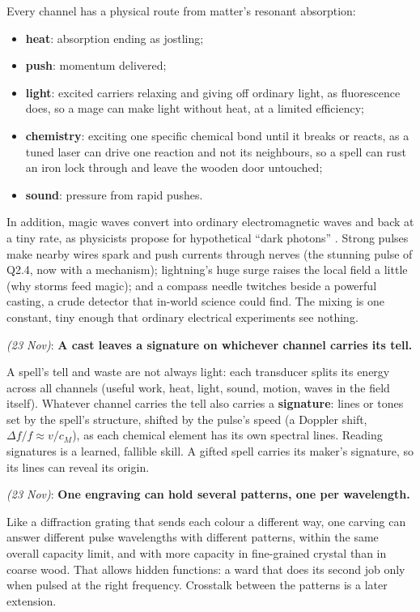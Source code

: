 \documentclass[11pt,a4paper]{article}
\newcommand{\decision}[3]{\par\smallskip\noindent{\color{dec}\textbf{Decision #1}} \textit{(#2)}: \textbf{#3}\par}
\begin{document}
Every channel has a physical route from matter's resonant absorption:
\begin{itemize}
  \item \textbf{heat}: absorption ending as jostling;
  \item \textbf{push}: momentum delivered;
  \item \textbf{light}: excited carriers relaxing and giving off ordinary light, as fluorescence does, so a mage can make light without heat, at a limited efficiency;
  \item \textbf{chemistry}: exciting one specific chemical bond until it breaks or reacts, as a tuned laser can drive one reaction and not its neighbours, so a spell can rust an iron lock through and leave the wooden door untouched;
  \item \textbf{sound}: pressure from rapid pushes.
\end{itemize}
In addition, magic waves convert into ordinary electromagnetic waves and back at a tiny rate, as physicists propose for hypothetical ``dark photons'' \cite{holdom}. Strong pulses make nearby wires spark and push currents through nerves (the stunning pulse of Q2.4, now with a mechanism); lightning's huge surge raises the local field a little (why storms feed magic); and a compass needle twitches beside a powerful casting, a crude detector that in-world science could find. The mixing is one constant, tiny enough that ordinary electrical experiments see nothing.

\decision{MS3}{23 Nov}{A cast leaves a signature on whichever channel carries its tell.}

A spell's tell and waste are not always light: each transducer splits its energy across all channels (useful work, heat, light, sound, motion, waves in the field itself). Whatever channel carries the tell also carries a \textbf{signature}: lines or tones set by the spell's structure, shifted by the pulse's speed (a Doppler shift, $\Delta f/f \approx v/c_M$), as each chemical element has its own spectral lines. Reading signatures is a learned, fallible skill. A gifted spell carries its maker's signature, so its lines can reveal its origin.

\decision{MS5}{23 Nov}{One engraving can hold several patterns, one per wavelength.}

Like a diffraction grating that sends each colour a different way, one carving can answer different pulse wavelengths with different patterns, within the same overall capacity limit, and with more capacity in fine-grained crystal than in coarse wood. That allows hidden functions: a ward that does its second job only when pulsed at the right frequency. Crosstalk between the patterns is a later extension.
\end{document}
